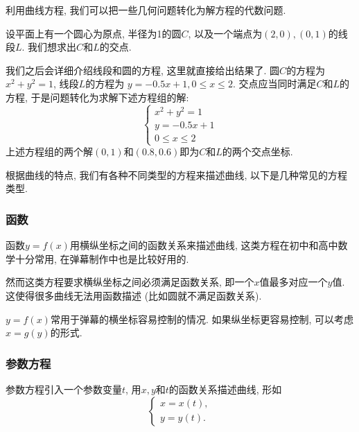 利用曲线方程, 我们可以把一些几何问题转化为解方程的代数问题.

\begin{example}
  设平面上有一个圆心为原点, 半径为1的圆$C$,
  以及一个端点为$(2,0),(0,1)$的线段$L$.
  我们想求出$C$和$L$的交点.

  我们之后会详细介绍线段和圆的方程, 这里就直接给出结果了.
  圆$C$的方程为$x^2+y^2=1$, 线段$L$的方程为
  $y=-0.5x+1, 0\le{x}\le2$.
  交点应当同时满足$C$和$L$的方程, 于是问题转化为求解下述方程组的解:
  \[
    \begin{cases}
      x^2 + y^2 = 1  \\
      y = -0.5 x + 1 \\
      0 \le x \le 2
    \end{cases}
  \]
  上述方程组的两个解$(0,1)$和$(0.8,0.6)$即为$C$和$L$的两个交点坐标.
\end{example}

根据曲线的特点, 我们有各种不同类型的方程来描述曲线,
以下是几种常见的方程类型.

\subsubsection{函数}

函数$y=f(x)$用横纵坐标之间的函数关系来描述曲线,
这类方程在初中和高中数学十分常用,
在弹幕制作中也是比较好用的.

然而这类方程要求横纵坐标之间必须满足函数关系,
即一个$x$值最多对应一个$y$值.
这使得很多曲线无法用函数描述 (比如圆就不满足函数关系).

$y=f(x)$常用于弹幕的横坐标容易控制的情况.
如果纵坐标更容易控制, 可以考虑$x=g(y)$的形式.

\begin{center}
\end{center}

\subsubsection{参数方程}

参数方程引入一个参数变量$t$, 用$x,y$和$t$的函数关系描述曲线, 形如
\[
  \begin{cases}
    x = x(t), \\ y = y(t).
  \end{cases}
\]

